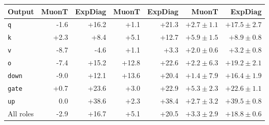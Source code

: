 \begin{table}[tbp]
\begin{tabularx}{\textwidth}{@{}>{\raggedright\arraybackslash}Xrrrrrr@{}}
\cmidrule(lr){2-3}\cmidrule(lr){4-5}\cmidrule(lr){6-7}
Output & MuonT & ExpDiag & MuonT & ExpDiag & MuonT & ExpDiag \\\midrule
\texttt{q} & -1.6 & +16.2 & +1.1 & +21.3 & $+2.7\pm1.1$ & $+17.5\pm2.7$ \\
\texttt{k} & +2.3 & +8.4 & +5.1 & +12.7 & $+5.9\pm1.5$ & $+8.9\pm0.8$ \\
\texttt{v} & -8.7 & -4.6 & +1.1 & +3.3 & $+2.0\pm0.6$ & $+3.2\pm0.8$ \\
\texttt{o} & -7.4 & +15.2 & +12.8 & +22.6 & $+2.2\pm6.3$ & $+19.2\pm2.1$ \\
\texttt{down} & -9.0 & +12.1 & +13.6 & +20.4 & $+1.4\pm7.9$ & $+16.4\pm1.9$ \\
\texttt{gate} & +0.7 & +23.6 & +3.0 & +22.9 & $+5.3\pm2.3$ & $+22.6\pm1.1$ \\
\texttt{up} & 0.0 & +38.6 & +2.3 & +38.4 & $+2.7\pm3.2$ & $+39.5\pm0.8$ \\
\midrule
All roles & -2.9 & +16.7 & +5.1 & +20.5 & $+3.3\pm2.9$ & $+18.8\pm0.6$ \\
\bottomrule\end{tabularx}
\end{table}
